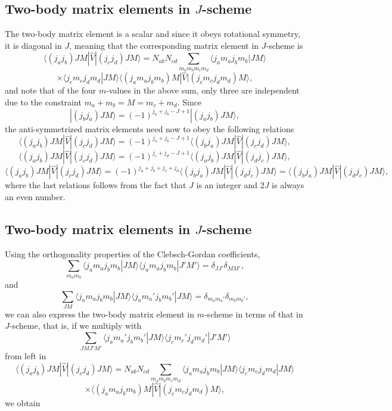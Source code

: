 \documentclass[%
twoside,                 %
final,                   %
10pt]{article}
\begin{document}
\subsection{Two-body matrix elements in $J$-scheme}
\begin{block}{}
The two-body matrix element is a scalar and since it obeys rotational symmetry, it is diagonal in $J$, 
meaning that the corresponding matrix element in $J$-scheme is 
\[
\langle (j_aj_b) JM | \hat{V} | (j_cj_d) JM \rangle = N_{ab}N_{cd}\sum_{m_am_b m_cm_d}\langle j_am_aj_bm_b|JM\rangle
\]
\[\times \langle j_cm_cj_dm_d|JM\rangle\langle (j_am_aj_bm_b)M |  \hat{V} | (j_cm_cj_dm_d)M \rangle,
\]
and note that of the four $m$-values in the above sum, only three are independent due to the constraint $m_a+m_b=M=m_c+m_d$.
Since
\[
|(j_bj_a)JM\rangle=(-1)^{j_a+j_b-J+1}|(j_aj_b)JM\rangle,
\]
the anti-symmetrized matrix elements need now to obey the following relations
\[
\langle (j_aj_b) JM | \hat{V} | (j_cj_d) JM \rangle = (-1)^{j_a+j_b-J+1}\langle (j_bj_a) JM | \hat{V} | (j_cj_d) JM \rangle,
\]
\[
\langle (j_aj_b) JM | \hat{V} | (j_cj_d) JM \rangle = (-1)^{j_c+j_d-J+1}\langle (j_aj_b) JM | \hat{V} | (j_dj_c) JM \rangle,
\]
\[
\langle (j_aj_b) JM | \hat{V} | (j_cj_d) JM \rangle = (-1)^{j_a+j_b+j_c+j_d}\langle (j_bj_a) JM | \hat{V} | (j_dj_c) JM \rangle=\langle (j_bj_a) JM | \hat{V} | (j_dj_c) JM \rangle,
\]
where the last relations follows from the fact that $J$ is an integer and $2J$ is always an even number.
\end{block}

\subsection{Two-body matrix elements in $J$-scheme}
\begin{block}{}
Using the orthogonality properties of the Clebsch-Gordan coefficients,
\[
\sum_{m_am_b}\langle j_am_aj_bm_b|JM\rangle\langle j_am_aj_bm_b|J'M'\rangle=\delta_{JJ'}\delta_{MM'},
\]
and
\[
\sum_{JM}\langle j_am_aj_bm_b|JM\rangle\langle j_am_a'j_bm_b'|JM\rangle=\delta_{m_am_a'}\delta_{m_bm_b'},
\]
we can also express the two-body matrix element in $m$-scheme in terms of that in $J$-scheme, that is, if we multiply with 
\[
\sum_{JMJ'M'}\langle j_am_a'j_bm_b'|JM\rangle\langle j_cm_c'j_dm_d'|J'M'\rangle
\]
from left in
\[
\langle (j_a j_b) JM | \hat{V} | (j_c j_d) JM \rangle = N_{ab}N_{cd}\sum_{m_a m_b m_c m_d}\langle j_am_aj_bm_b|JM\rangle\langle j_cm_cj_dm_d|JM\rangle
\]
\[
\times \langle (j_am_aj_bm_b)M|  \hat{V} | (j_cm_cj_dm_d)M\rangle,
\]
we obtain
\end{block}
\end{document}
